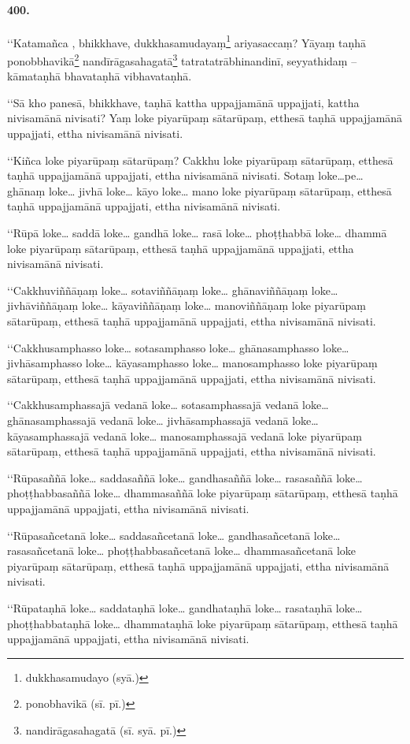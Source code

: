 \paragraph{400.} ‘‘Katamañca , bhikkhave, dukkhasamudayaṃ\footnote{dukkhasamudayo (syā.)} ariyasaccaṃ? Yāyaṃ taṇhā ponobbhavikā\footnote{ponobhavikā (sī. pī.)} nandīrāgasahagatā\footnote{nandirāgasahagatā (sī. syā. pī.)} tatratatrābhinandinī, seyyathidaṃ – kāmataṇhā bhavataṇhā vibhavataṇhā.

‘‘Sā kho panesā, bhikkhave, taṇhā kattha uppajjamānā uppajjati, kattha nivisamānā nivisati? Yaṃ loke piyarūpaṃ sātarūpaṃ, etthesā taṇhā uppajjamānā uppajjati, ettha nivisamānā nivisati.

‘‘Kiñca loke piyarūpaṃ sātarūpaṃ? Cakkhu loke piyarūpaṃ sātarūpaṃ, etthesā taṇhā uppajjamānā uppajjati, ettha nivisamānā nivisati. Sotaṃ loke…pe… ghānaṃ loke… jivhā loke… kāyo loke… mano loke piyarūpaṃ sātarūpaṃ, etthesā taṇhā uppajjamānā uppajjati, ettha nivisamānā nivisati.

‘‘Rūpā loke… saddā loke… gandhā loke… rasā loke… phoṭṭhabbā loke… dhammā loke piyarūpaṃ sātarūpaṃ, etthesā taṇhā uppajjamānā uppajjati, ettha nivisamānā nivisati.

‘‘Cakkhuviññāṇaṃ loke… sotaviññāṇaṃ loke… ghānaviññāṇaṃ loke… jivhāviññāṇaṃ loke… kāyaviññāṇaṃ loke… manoviññāṇaṃ loke piyarūpaṃ sātarūpaṃ, etthesā taṇhā uppajjamānā uppajjati, ettha nivisamānā nivisati.

‘‘Cakkhusamphasso loke… sotasamphasso loke… ghānasamphasso loke… jivhāsamphasso loke… kāyasamphasso loke… manosamphasso loke piyarūpaṃ sātarūpaṃ, etthesā taṇhā uppajjamānā uppajjati, ettha nivisamānā nivisati.

‘‘Cakkhusamphassajā vedanā loke… sotasamphassajā vedanā loke… ghānasamphassajā vedanā loke… jivhāsamphassajā vedanā loke… kāyasamphassajā vedanā loke… manosamphassajā vedanā loke piyarūpaṃ sātarūpaṃ, etthesā taṇhā uppajjamānā uppajjati, ettha nivisamānā nivisati.

‘‘Rūpasaññā loke… saddasaññā loke… gandhasaññā loke… rasasaññā loke… phoṭṭhabbasaññā loke… dhammasaññā loke piyarūpaṃ sātarūpaṃ, etthesā taṇhā uppajjamānā uppajjati, ettha nivisamānā nivisati.

‘‘Rūpasañcetanā loke… saddasañcetanā loke… gandhasañcetanā loke… rasasañcetanā loke… phoṭṭhabbasañcetanā loke… dhammasañcetanā loke piyarūpaṃ sātarūpaṃ, etthesā taṇhā uppajjamānā uppajjati, ettha nivisamānā nivisati.

‘‘Rūpataṇhā loke… saddataṇhā loke… gandhataṇhā loke… rasataṇhā loke… phoṭṭhabbataṇhā loke… dhammataṇhā loke piyarūpaṃ sātarūpaṃ, etthesā taṇhā uppajjamānā uppajjati, ettha nivisamānā nivisati.

